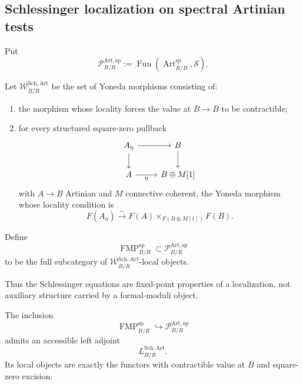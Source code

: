 \subsection{Schlessinger localization on spectral Artinian tests}

Put
\[
    \mathcal P^{\mathrm{Art,sp}}_{B/R}
    :=
    \operatorname{Fun}
    \left(\operatorname{Art}^{\mathrm{sp}}_{R/B},\mathcal S\right).
\]

\begin{definition}
\label{def:bnla-schlessinger-generators}
Let $\mathcal W^{\mathrm{Sch,Art}}_{B/R}$ be the set of Yoneda morphisms
consisting of:
\begin{enumerate}
    \item the morphism whose locality forces the value at $B\to B$ to be
    contractible;
    \item for every structured square-zero pullback
    \[
    \begin{tikzcd}
    A_\eta \arrow[r] \arrow[d] & B \arrow[d]\\
    A \arrow[r,"\eta"'] & B\oplus M[1]
    \end{tikzcd}
    \]
    with $A\to B$ Artinian and $M$ connective coherent, the Yoneda morphism
    whose locality condition is
    \[
        F(A_\eta)
        \xrightarrow{\sim}
        F(A)\times_{F(B\oplus M[1])}F(B).
    \]
\end{enumerate}
\end{definition}

\begin{definition}
\label{def:bnla-spectral-fmp}
Define
\[
    \operatorname{FMP}^{\mathrm{sp}}_{B/R}
    \subset
    \mathcal P^{\mathrm{Art,sp}}_{B/R}
\]
to be the full subcategory of
$\mathcal W^{\mathrm{Sch,Art}}_{B/R}$-local objects.
\end{definition}

Thus the Schlessinger equations are fixed-point properties of a localization,
not auxiliary structure carried by a formal-moduli object.

\begin{proposition}
\label{prop:bnla-artinian-schlessinger-reflector}
The inclusion
\[
    \operatorname{FMP}^{\mathrm{sp}}_{B/R}
    \hookrightarrow
    \mathcal P^{\mathrm{Art,sp}}_{B/R}
\]
admits an accessible left adjoint
\[
    L^{\mathrm{Sch,Art}}_{B/R}.
\]
Its local objects are exactly the functors with contractible value at $B$ and
square-zero excision.
\end{proposition}

